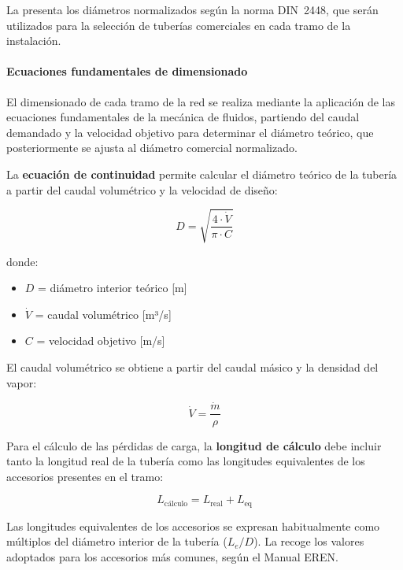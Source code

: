 La  presenta los diámetros normalizados según la norma DIN~2448, que serán utilizados para la selección de tuberías comerciales en cada tramo de la instalación.

\paragraph{Ecuaciones fundamentales de dimensionado}

El dimensionado de cada tramo de la red se realiza mediante la aplicación de las ecuaciones fundamentales de la mecánica de fluidos, partiendo del caudal demandado y la velocidad objetivo para determinar el diámetro teórico, que posteriormente se ajusta al diámetro comercial normalizado.

La \textbf{ecuación de continuidad} permite calcular el diámetro teórico de la tubería a partir del caudal volumétrico y la velocidad de diseño:

\begin{equation}
	D = \sqrt{\frac{4 \cdot \dot{V}}{\pi \cdot C}}
	\label{eq:continuidad-diametro}
\end{equation}

\noindent donde:
\begin{itemize}[leftmargin=2em, label={}]
	\item $D$ = diámetro interior teórico [m]
	\item $\dot{V}$ = caudal volumétrico [m³/s]
	\item $C$ = velocidad objetivo [m/s]
\end{itemize}

El caudal volumétrico se obtiene a partir del caudal másico y la densidad del vapor:

\begin{equation}
	\dot{V} = \frac{\dot{m}}{\rho}
	\label{eq:caudal-volumetrico}
\end{equation}

Para el cálculo de las pérdidas de carga, la \textbf{longitud de cálculo} debe incluir tanto la longitud real de la tubería como las longitudes equivalentes de los accesorios presentes en el tramo:

\begin{equation}
	L_{\text{cálculo}} = L_{\text{real}} + L_{\text{eq}}
	\label{eq:longitud-calculo}
\end{equation}

Las longitudes equivalentes de los accesorios se expresan habitualmente como múltiplos del diámetro interior de la tubería ($L_e/D$). La  recoge los valores adoptados para los accesorios más comunes, según el Manual EREN.


